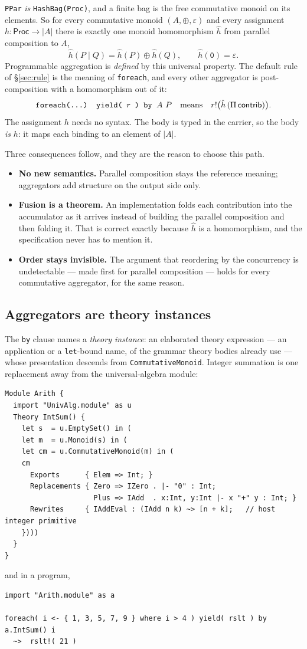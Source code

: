 \documentclass[11pt]{article}
\theoremstyle{definition}
\theoremstyle{plain}
\theoremstyle{remark}
\newcommand{\Proc}{\mathsf{Proc}}
\newcommand{\fe}{\texttt{foreach}}
\begin{document}
\texttt{PPar} \emph{is} \texttt{HashBag(Proc)}, and a finite bag is the free
commutative monoid on its elements. So for every commutative monoid
\((A, \oplus, \varepsilon)\) and every assignment \(h : \Proc \to |A|\) there is
exactly one monoid homomorphism \(\hat h\) from parallel composition to \(A\),
\[
\hat h(P \mid Q) = \hat h(P) \oplus \hat h(Q),
\qquad
\hat h(\texttt{0}) = \varepsilon .
\]
Programmable aggregation is \emph{defined} by this universal property. The
default rule of \S\ref{sec:rule} is the meaning of \fe{}, and every other
aggregator is post-composition with a homomorphism out of it:
\[
\texttt{foreach(\dots) yield( }r\texttt{ ) by }A\ P
\quad\text{means}\quad
r!\big(\hat h\,(\Pi\,\mathsf{contrib})\big).
\]
The assignment \(h\) needs no syntax. The body is typed in the carrier, so the
body \emph{is} \(h\): it maps each binding to an element of \(|A|\).

Three consequences follow, and they are the reason to choose this path.
\begin{itemize}[nosep]
\item \textbf{No new semantics.} Parallel composition stays the reference
meaning; aggregators add structure on the output side only.
\item \textbf{Fusion is a theorem.} An implementation folds each contribution
into the accumulator as it arrives instead of building the parallel composition
and then folding it. That is correct exactly because \(\hat h\) is a
homomorphism, and the specification never has to mention it.
\item \textbf{Order stays invisible.} The argument that reordering by the
concurrency is undetectable --- made first for parallel composition --- holds for
every commutative aggregator, for the same reason.
\end{itemize}

\subsection{Aggregators are theory instances}
\label{sec:instances}

The \texttt{by} clause names a \emph{theory instance}: an elaborated theory
expression --- an application or a \texttt{let}-bound name, of the grammar
theory bodies already use --- whose presentation descends from
\texttt{CommutativeMonoid}. Integer summation is one replacement away from the
universal-algebra module:
\begin{lstlisting}[language=mettail]
Module Arith {
  import "UnivAlg.module" as u
  Theory IntSum() {
    let s  = u.EmptySet() in (
    let m  = u.Monoid(s) in (
    let cm = u.CommutativeMonoid(m) in (
    cm
      Exports      { Elem => Int; }
      Replacements { Zero => IZero . |- "0" : Int;
                     Plus => IAdd  . x:Int, y:Int |- x "+" y : Int; }
      Rewrites     { IAddEval : (IAdd n k) ~> [n + k];   // host integer primitive
    })))
  }
}
\end{lstlisting}
and in a program,
\begin{lstlisting}
import "Arith.module" as a

foreach( i <- { 1, 3, 5, 7, 9 } where i > 4 ) yield( rslt ) by a.IntSum() i
  ~>  rslt!( 21 )
\end{lstlisting}
\end{document}
